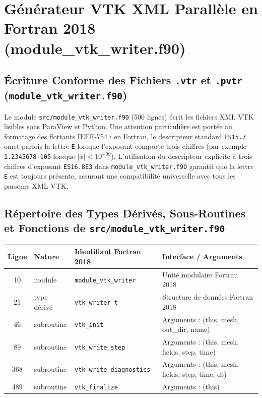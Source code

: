 \documentclass[10pt,a4paper,oneside]{book}
\begin{document}
\chapter{Générateur VTK XML Parallèle en Fortran 2018 (module_vtk_writer.f90)}
\section{Écriture Conforme des Fichiers \texttt{.vtr} et \texttt{.pvtr} (\texttt{module\_vtk\_writer.f90})}
Le module \texttt{src/module\_vtk\_writer.f90} (500 lignes) écrit les fichiers XML VTK lisibles sous ParaView et Python. Une attention particulière est portée au formatage des flottants IEEE-754 : en Fortran, le descripteur standard \texttt{ES15.7} omet parfois la lettre \texttt{E} lorsque l'exposant comporte trois chiffres (par exemple \texttt{1.2345678-105} lorsque $|x| < 10^{-99}$). L'utilisation du descripteur explicite à trois chiffres d'exposant \texttt{ES16.8E3} dans \texttt{module\_vtk\_writer.f90} garantit que la lettre \texttt{E} est toujours présente, assurant une compatibilité universelle avec tous les parseurs XML VTK.

\section{Répertoire des Types Dérivés, Sous-Routines et Fonctions de \texttt{src/module\_vtk\_writer.f90}}
\begin{center}\small
\begin{tabular}{clll}
\toprule
\textbf{Ligne} & \textbf{Nature} & \textbf{Identifiant Fortran 2018} & \textbf{Interface / Arguments} \\
\midrule
10 & module & \texttt{module\_vtk\_writer} & Unité modulaire Fortran 2018 \\
21 & type dérivé & \texttt{vtk\_writer\_t} & Structure de données Fortran 2018 \\
46 & subroutine & \texttt{vtk\_init} & Arguments : (this, mesh, out\_dir, name) \\
89 & subroutine & \texttt{vtk\_write\_step} & Arguments : (this, mesh, fields, step, time) \\
368 & subroutine & \texttt{vtk\_write\_diagnostics} & Arguments : (this, mesh, fields, step, time, dt) \\
489 & subroutine & \texttt{vtk\_finalize} & Arguments : (this) \\
\bottomrule
\end{tabular}
\end{center}
\end{document}
